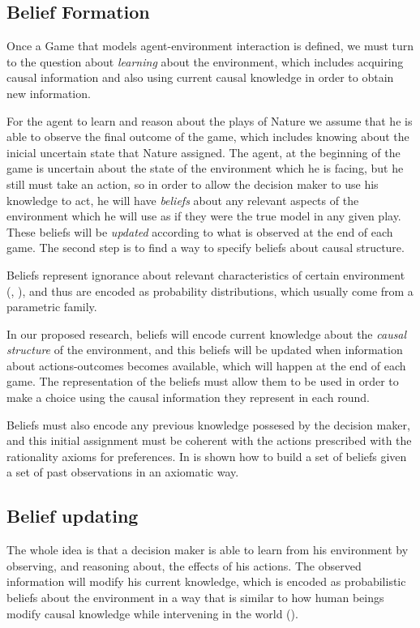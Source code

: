 \documentclass[english,letterpaper,12pt,final]{article}
\theoremstyle{definition}
\begin{document}
\subsection{Belief Formation}
Once a Game that models agent-environment interaction is defined, we must turn to the question about \textit{learning} about the environment, which includes acquiring causal information and also using current causal knowledge in order to obtain new information.

For the agent to learn and reason about the plays of Nature we assume that he is able to observe the final outcome of the game, which includes knowing about the inicial uncertain state that Nature assigned. The agent, at the beginning of the game is uncertain about the state of the environment which he is facing, but he still must take an action, so in order to allow the decision maker to use his knowledge to act, he will have \textit{beliefs} about any relevant aspects of the environment which he will use as if they were the true model in any given play. These beliefs will be \textit{updated} according to what is observed at the end of each game. The second step is to find a way to specify beliefs about causal structure.

Beliefs represent ignorance about relevant characteristics of certain environment (\cite{bernardo2000bayesian}, \cite{peterson2017introduction}), and thus are encoded as probability distributions, which usually come from a parametric family. 

In our proposed research, beliefs will encode current knowledge about the \textit{causal structure} of the environment, and this beliefs will be updated when information about actions-outcomes becomes available, which will happen at the end of each game. The representation of the beliefs must allow them to be used in order to make a choice using the causal information they represent in each round.

Beliefs must also encode any previous knowledge possesed by the decision maker, and this initial assignment must be coherent with the actions prescribed with the rationality axioms for preferences. In \cite{billot2005probabilities} is shown how to build a set of beliefs given a set of past observations in an axiomatic way.

\subsection{Belief updating}
The whole idea is that a decision maker is able to learn from his environment by observing, and reasoning about, the effects of his actions. The observed information will modify his current knowledge, which is encoded as probabilistic beliefs about the environment in a way that is similar to how human beings modify causal knowledge while intervening in the world (\cite{hagmayer2013repeated}).
\end{document}
